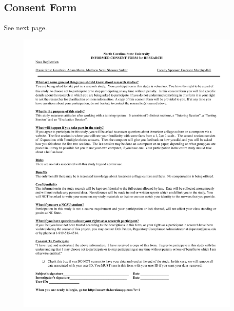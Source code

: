 \documentclass{sig-alternate-05-2015}
\begin{document}
\subsection{Consent Form}
See next page.
\begin{figure}[!h]
    \centering
    \includegraphics[width=\linewidth]{appendix/consent_form.pdf}
\end{figure}
\end{document}
